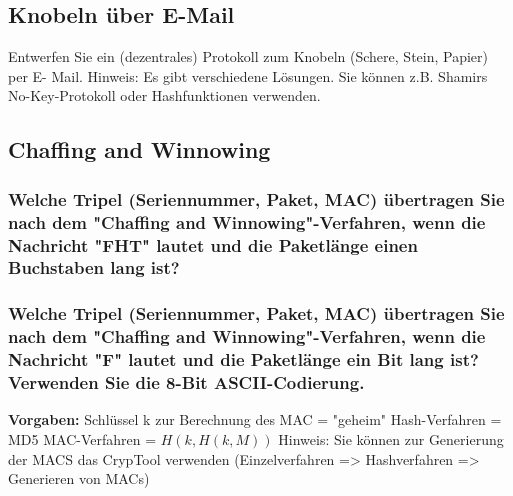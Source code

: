 \subsection{Knobeln über E-Mail}
Entwerfen Sie ein (dezentrales) Protokoll zum Knobeln (Schere, Stein, Papier) per E-
Mail. Hinweis: Es gibt verschiedene Lösungen. Sie können z.B. Shamirs No-Key-Protokoll
oder Hashfunktionen verwenden.

\subsection{Chaffing and Winnowing}
\subsubsection{Welche Tripel (Seriennummer, Paket, MAC) übertragen Sie nach dem
"Chaffing and Winnowing"-Verfahren, wenn die Nachricht "FHT" lautet und die
Paketlänge einen Buchstaben lang ist?}
\subsubsection{Welche Tripel (Seriennummer, Paket, MAC) übertragen Sie nach dem
"Chaffing and Winnowing"-Verfahren, wenn die Nachricht "F" lautet und die
Paketlänge ein Bit lang ist? Verwenden Sie die 8-Bit ASCII-Codierung.}

\textbf{Vorgaben:}
Schlüssel k zur Berechnung des MAC = "geheim"
Hash-Verfahren = MD5
MAC-Verfahren = $H(k, H(k, M))$
Hinweis: Sie können zur Generierung der MACS das CrypTool verwenden
(Einzelverfahren => Hashverfahren => Generieren von MACs)
